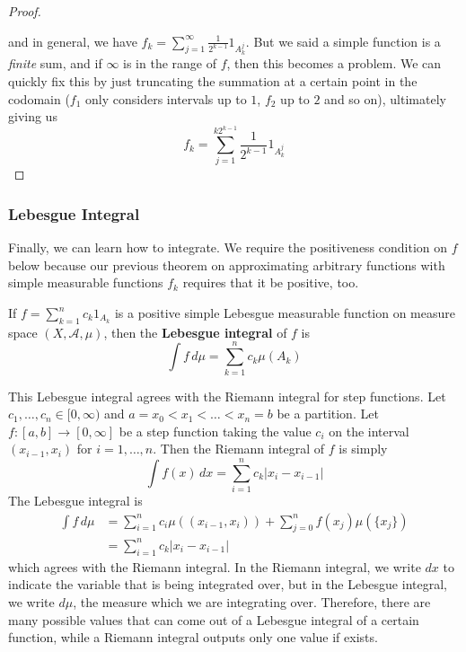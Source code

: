 \begin{proof}
\begin{center}
      \end{center}
      and in general, we have $f_k = \sum_{j=1}^\infty \frac{1}{2^{k-1}} 1_{A^j_k}$. But we said a simple function is a \textit{finite} sum, and if $\infty$ is in the range of $f$, then this becomes a problem. We can quickly fix this by just truncating the summation at a certain point in the codomain ($f_1$ only considers intervals up to $1$, $f_2$ up to $2$ and so on), ultimately giving us 
      \begin{equation}
        f_k = \sum_{j=1}^{k 2^{k-1}} \frac{1}{2^{k-1}} 1_{A^j_k}
      \end{equation}
    \end{proof}

  \subsubsection{Lebesgue Integral}

    Finally, we can learn how to integrate. We require the positiveness condition on $f$ below because our previous theorem on approximating arbitrary functions with simple measurable functions $f_k$ requires that it be positive, too. 

    \begin{definition}
      If $f = \sum_{k=1}^n c_k 1_{A_k}$ is a positive simple Lebesgue measurable function on measure space $(X, \mathcal{A}, \mu)$, then the \textbf{Lebesgue integral} of $f$ is 
      \begin{equation}
        \int f \, d\mu = \sum_{k=1}^n c_k \mu(A_k)
      \end{equation}
    \end{definition}

    This Lebesgue integral agrees with the Riemann integral for step functions. Let $c_1, \ldots, c_n \in [0, \infty)$ and $a = x_0 < x_1 < \ldots < x_n = b$ be a partition. Let $f: [a, b] \longrightarrow [0, \infty]$ be a step function taking the value $c_i$ on the interval $(x_{i-1}, x_i)$ for $i = 1, \ldots, n$. Then the Riemann integral of $f$ is simply 
    \begin{equation}
      \int f(x) \,dx = \sum_{i=1}^n c_k |x_i - x_{i-1}|
    \end{equation}
    The Lebesgue integral is 
    \begin{align*}
      \int f \, d \mu & = \sum_{i=1}^n c_i \mu((x_{i-1}, x_i)) + \sum_{j=0}^n f(x_j) \mu(\{x_j\}) \\
      & = \sum_{i=1}^n c_k |x_i - x_{i-1}|
    \end{align*}
    which agrees with the Riemann integral. In the Riemann integral, we write $dx$ to indicate the variable that is being integrated over, but in the Lebesgue integral, we write $d \mu$, the measure which we are integrating over. Therefore, there are many possible values that can come out of a Lebesgue integral of a certain function, while a Riemann integral outputs only one value if exists. 

